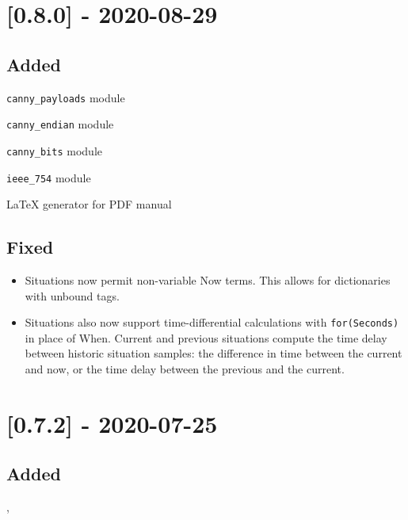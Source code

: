 \section{[0.8.0] - 2020-08-29}

\subsection{Added}

\begin{shortlist}
    \item \verb$canny_payloads$ module
    \item \verb$canny_endian$ module
    \item \verb$canny_bits$ module
    \item \verb$ieee_754$ module
    \item LaTeX generator for PDF manual
\end{shortlist}

\subsection{Fixed}

\begin{itemize}
    \item Situations now permit non-variable Now terms. This allows for dictionaries
with unbound tags.
    \item Situations also now support time-differential calculations with \verb$for(Seconds)$
in place of When. Current and previous situations compute the time delay
between historic situation samples: the difference in time between the current
and now, or the time delay between the previous and the current.
\end{itemize}

\section{[0.7.2] - 2020-07-25}

\subsection{Added}

\begin{shortlist}
    \item {}
    \item {}
    \item {}
    \item {}, 
\end{shortlist}

